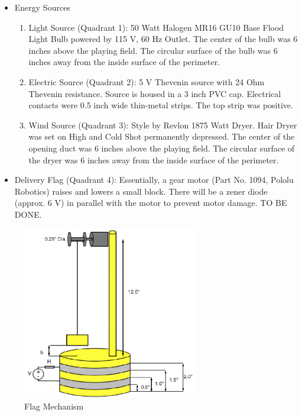 \documentclass[12pt]{article}
\begin{document}
\begin{itemize}
	\item Energy Sources
		\begin{enumerate}
			\item Light Source (Quadrant 1): 50 Watt Halogen MR16 GU10 Base Flood Light Bulb powered by 115 V, 60 Hz Outlet. The center of the bulb was 6 inches above the playing field. The circular surface of the bulb was 6 inches away from the inside surface of the perimeter. 
			\item Electric Source (Quadrant 2): 5 V Thevenin source with 24 Ohm Thevenin resistance. Source is housed in a 3 inch PVC cap. Electrical contacts were 0.5 inch wide thin-metal strips. The top strip was positive. 
			\item Wind Source (Quadrant 3): Style by Revlon 1875 Watt Dryer. Hair Dryer was set on High and Cold Shot permanently depressed. The center of the opening duct was 6 inches above the playing field. The circular surface of the dryer was 6 inches away from the inside surface of the perimeter. 
		\end{enumerate} 
\end{itemize}
\begin{itemize}
	\item Delivery Flag (Quadrant 4): Essentially, a gear motor (Part No. 1094, Pololu Robotics) raises and lowers a small block. There will be a zener diode (approx. 6 V) in parallel with the motor to prevent motor damage. TO BE DONE. 
\end{itemize}
\begin{figure}[htbp] %
   \centering
   \includegraphics[width=3in]{Robotics2012Flag} 
   \caption{Flag Mechanism}
   \label{fig:flagmechanism}
\end{figure}
\end{document}
